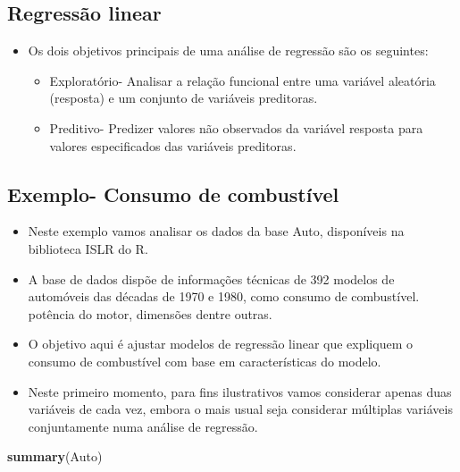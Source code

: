 \documentclass[
]{article}
\newenvironment{Shaded}{\begin{snugshade}}{\end{snugshade}}
\newcommand{\FunctionTok}[1]{\textcolor[rgb]{0.13,0.29,0.53}{\textbf{#1}}}
\newcommand{\NormalTok}[1]{#1}
\providecommand{\tightlist}{%
  \setlength{\itemsep}{0pt}\setlength{\parskip}{0pt}}
\begin{document}
\subsection{Regressão linear}\label{regressuxe3o-linear-1}

\begin{itemize}
\tightlist
\item
  Os dois objetivos principais de uma análise de regressão são os
  seguintes:

  \begin{itemize}
  \tightlist
  \item
    Exploratório- Analisar a relação funcional entre uma variável
    aleatória (resposta) e um conjunto de variáveis preditoras.
  \item
    Preditivo- Predizer valores não observados da variável resposta para
    valores especificados das variáveis preditoras.
  \end{itemize}
\end{itemize}

\subsection{Exemplo- Consumo de
combustível}\label{exemplo--consumo-de-combustuxedvel}

\begin{itemize}
\tightlist
\item
  Neste exemplo vamos analisar os dados da base Auto, disponíveis na
  biblioteca ISLR do R.
\item
  A base de dados dispõe de informações técnicas de 392 modelos de
  automóveis das décadas de 1970 e 1980, como consumo de combustível.
  potência do motor, dimensões dentre outras.
\item
  O objetivo aqui é ajustar modelos de regressão linear que expliquem o
  consumo de combustível com base em características do modelo.
\item
  Neste primeiro momento, para fins ilustrativos vamos considerar apenas
  duas variáveis de cada vez, embora o mais usual seja considerar
  múltiplas variáveis conjuntamente numa análise de regressão.
\end{itemize}

\begin{Shaded}
\begin{Highlighting}[]
\FunctionTok{summary}\NormalTok{(Auto)}
\end{Highlighting}
\end{Shaded}
\end{document}
